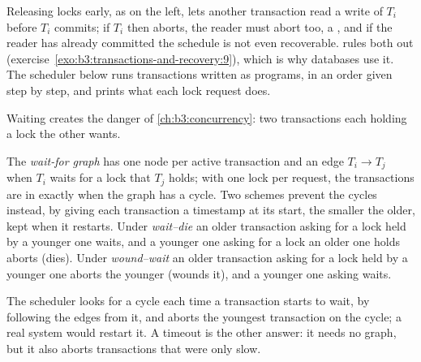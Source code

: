 Releasing locks early, as on the left, lets another transaction read a write of $T_i$ before $T_i$ commits; if $T_i$ then aborts, the reader must abort too, a , and if the reader has already committed the schedule is not even recoverable.  rules both out (exercise~\ref{exo:b3:transactions-and-recovery:9}), which is why databases use it. The scheduler below runs transactions written as programs, in an order given step by step, and prints what each lock request does.

\label{lst:b3:transactions-and-recovery:twopl}

Waiting creates the danger of \cref{ch:b3:concurrency}: two transactions each holding a lock the other wants.

\begin{definition}\label{def:b3:transactions-and-recovery:deadlock}
The \emph{wait-for graph} has one node per active transaction and an edge $T_i \to T_j$ when $T_i$ waits for a lock that $T_j$ holds; with one lock per request, the transactions are in  exactly when the graph has a cycle. Two schemes prevent the cycles instead, by giving each transaction a timestamp at its start, the smaller the older, kept when it restarts. Under \emph{wait--die} an older transaction asking for a lock held by a younger one waits, and a younger one asking for a lock an older one holds aborts (dies). Under \emph{wound--wait} an older transaction asking for a lock held by a younger one aborts the younger (wounds it), and a younger one asking waits.
\end{definition}

\label{out:b3:transactions-and-recovery:twopl}

The scheduler looks for a cycle each time a transaction starts to wait, by following the edges from it, and aborts the youngest transaction on the cycle; a real system would restart it. A timeout is the other answer: it needs no graph, but it also aborts transactions that were only slow.


